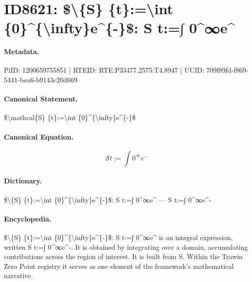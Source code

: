 \section*{ID8621: \$\textbackslash{}\{S\} \{t\}:=\textbackslash{}int \{0\}\textasciicircum{}\{\textbackslash{}infty\}e\textasciicircum{}\{-\}\$: S t:=∫ 0\textasciicircum{}∞e\textasciicircum{}}
\paragraph{Metadata.}
PiID: 1200659755851 | RTEID: RTE:P33477.2575:T4.8947 | UUID: 709f89fd-f869-5441-bea6-b9143c20d669

\paragraph{Canonical Statement.}
\$\textbackslash{}mathcal\{S\} \{t\}:=\textbackslash{}int \{0\}\textasciicircum{}\{\textbackslash{}infty\}e\textasciicircum{}\{-\}\$

\paragraph{Canonical Equation.}
\[
\mathcal{S} {t}:=\int {0}^{\infty}e^{-}
\]

\paragraph{Dictionary.}
\$\textbackslash{}\{S\} \{t\}:=\textbackslash{}int \{0\}\textasciicircum{}\{\textbackslash{}infty\}e\textasciicircum{}\{-\}\$: S t:=∫ 0\textasciicircum{}∞e\textasciicircum{} — S t:=∫ 0\textasciicircum{}∞e\textasciicircum{}-

\paragraph{Encyclopedia.}
\$\textbackslash{}\{S\} \{t\}:=\textbackslash{}int \{0\}\textasciicircum{}\{\textbackslash{}infty\}e\textasciicircum{}\{-\}\$: S t:=∫ 0\textasciicircum{}∞e\textasciicircum{} is an integral expression, written S t:=∫ 0\textasciicircum{}∞e\textasciicircum{}-. It is obtained by integrating over a domain, accumulating contributions across the region of interest. It is built from S. Within the Trawin Zero Point registry it serves as one element of the framework's mathematical narrative.
